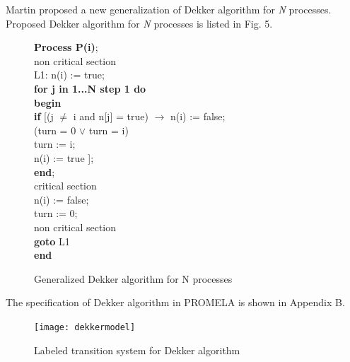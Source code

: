 \documentclass[conference]{IEEEtran}
\begin{document}
Martin \cite{14} proposed a new generalization of Dekker algorithm for \emph{N} processes. Proposed Dekker algorithm for \emph{N} processes is listed 
in Fig. 5.
\begin{figure}[!ht]
\hspace{.2cm}\textbf{Process P(i)};\\
\hspace*{.3cm}non critical section\\
\hspace*{.3cm}L1: n(i) := true;\\
\hspace*{.4cm}\textbf{for j in 1...N step 1 do}\\
\hspace*{.5cm}\textbf{begin}\\
\hspace*{.6cm}\textbf{if} [(j $\neq$ i and n[j] =  true) $\rightarrow$ n(i) := false;\\
\hspace*{4cm}(turn = 0 $\lor$ turn = i)\\
\hspace*{.6cm}turn := i;\\
\hspace*{.6cm}n(i) := true ];\\
\hspace*{.5cm}\textbf{end};\\
\hspace*{.3cm} critical section\\
\hspace*{.3cm}n(i) := false;\\
\hspace*{.3cm}turn := 0;\\
\hspace*{.3cm}non critical section\\
\hspace*{.3cm}\textbf{goto} L1\\
\hspace*{.2cm}\textbf{end}
\caption{Generalized Dekker algorithm for N processes}
\end{figure}

The specification of Dekker algorithm in PROMELA is shown in Appendix B. 
\begin{figure}[!ht]
\centering\texttt{[image: dekkermodel]}
\caption{Labeled transition system for Dekker algorithm} 
\end{figure}
\end{document}
